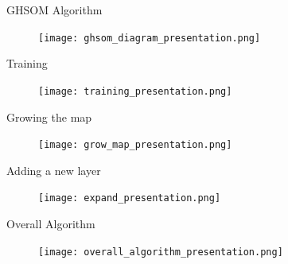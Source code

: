 \documentclass{beamer}
\begin{document}
	\begin{frame}{GHSOM Algorithm}
		\begin{figure}
			\centering
			\texttt{[image: ghsom\_diagram\_presentation.png]}
		\end{figure}
	\end{frame}
	
	\begin{frame}{Training}
%			
%
%
	\begin{figure}
		\texttt{[image: training\_presentation.png]}
	\end{figure}
	\end{frame}
	
	\begin{frame}{Growing the map}
	\begin{figure}
	\texttt{[image: grow\_map\_presentation.png]}
	\end{figure}	
	\end{frame}
	
	\begin{frame}{Adding a new layer}
	\begin{figure}
	\texttt{[image: expand\_presentation.png]}
	\end{figure}	
	\end{frame}	
	
	\begin{frame}{Overall Algorithm}
		\begin{figure}
			\centering
			\texttt{[image: overall\_algorithm\_presentation.png]}
		\end{figure}
	\end{frame}
\end{document}
